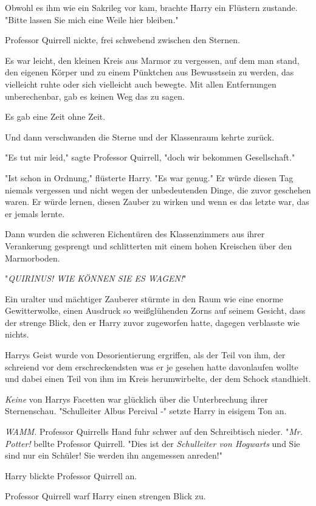 {Obwohl es ihm wie ein Sakrileg vor kam, brachte Harry ein Flüstern zustande. "Bitte lassen Sie mich eine Weile hier bleiben."

Professor Quirrell nickte, frei schwebend zwischen den Sternen.

Es war leicht, den kleinen Kreis aus Marmor zu vergessen, auf dem man stand, den eigenen Körper und zu einem Pünktchen aus Bewusstsein zu werden, das vielleicht ruhte oder sich vielleicht auch bewegte. Mit allen Entfernungen unberechenbar, gab es keinen Weg das zu sagen.

Es gab eine Zeit ohne Zeit.

Und dann verschwanden die Sterne und der Klassenraum kehrte zurück.

"Es tut mir leid," sagte Professor Quirrell, "doch wir bekommen Gesellschaft."

"Ist schon in Ordnung," flüsterte Harry. "Es war genug." Er würde diesen Tag niemals vergessen und nicht wegen der unbedeutenden Dinge, die zuvor geschehen waren. Er würde lernen, diesen Zauber zu wirken und wenn es das letzte war, das er jemals lernte.

Dann wurden die schweren Eichentüren des Klassenzimmers aus ihrer Verankerung gesprengt und schlitterten mit einem hohen Kreischen über den Marmorboden.

"\emph{QUIRINUS! WIE KÖNNEN SIE ES WAGEN!}"

Ein uralter und mächtiger Zauberer stürmte in den Raum wie eine enorme Gewitterwolke, einen Ausdruck so weißglühenden Zorns auf seinem Gesicht, dass der strenge Blick, den er Harry zuvor zugeworfen hatte, dagegen verblasste wie nichts.

Harrys Geist wurde von Desorientierung ergriffen, als der Teil von ihm, der schreiend vor dem erschreckendsten was er je gesehen hatte davonlaufen wollte und dabei einen Teil von ihm im Kreis herumwirbelte, der dem Schock standhielt.

\emph{Keine} von Harrys Facetten war glücklich über die Unterbrechung ihrer Sternenschau. "Schulleiter Albus Percival -" setzte Harry in eisigem Ton an.

\emph{WAMM.} Professor Quirrells Hand fuhr schwer auf den Schreibtisch nieder. "\emph{Mr. Potter!} bellte Professor Quirrell. "Dies ist der \emph{Schulleiter von Hogwarts} und Sie sind nur ein Schüler! Sie werden ihn angemessen anreden!"

Harry blickte Professor Quirrell an.

Professor Quirrell warf Harry einen strengen Blick zu.

}
